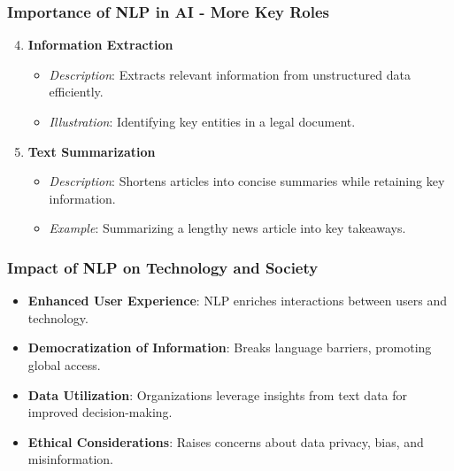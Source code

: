 \documentclass{beamer}
\begin{document}
\begin{frame}[fragile]
    \frametitle{Importance of NLP in AI - More Key Roles}
    \begin{enumerate}
        \setcounter{enumi}{3}
        \item \textbf{Information Extraction}
        \begin{itemize}
            \item \textit{Description}: Extracts relevant information from unstructured data efficiently.
            \item \textit{Illustration}: Identifying key entities in a legal document.
        \end{itemize}
        
        \item \textbf{Text Summarization}
        \begin{itemize}
            \item \textit{Description}: Shortens articles into concise summaries while retaining key information.
            \item \textit{Example}: Summarizing a lengthy news article into key takeaways.
        \end{itemize}
    \end{enumerate}
\end{frame}

\begin{frame}[fragile]
    \frametitle{Impact of NLP on Technology and Society}
    \begin{itemize}
        \item \textbf{Enhanced User Experience}: NLP enriches interactions between users and technology.
        \item \textbf{Democratization of Information}: Breaks language barriers, promoting global access.
        \item \textbf{Data Utilization}: Organizations leverage insights from text data for improved decision-making.
        \item \textbf{Ethical Considerations}: Raises concerns about data privacy, bias, and misinformation.
    \end{itemize}
\end{frame}
\end{document}
